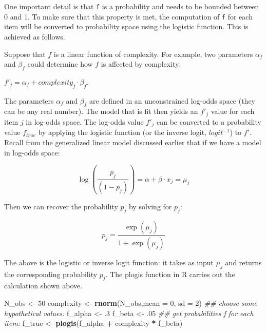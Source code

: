 \documentclass[12pt,]{krantz}
\newenvironment{Shaded}{\begin{snugshade}}{\end{snugshade}}
\newcommand{\CommentTok}[1]{\textcolor[rgb]{0.56,0.35,0.01}{\textit{#1}}}
\newcommand{\DataTypeTok}[1]{\textcolor[rgb]{0.13,0.29,0.53}{#1}}
\newcommand{\DecValTok}[1]{\textcolor[rgb]{0.00,0.00,0.81}{#1}}
\newcommand{\FloatTok}[1]{\textcolor[rgb]{0.00,0.00,0.81}{#1}}
\newcommand{\KeywordTok}[1]{\textcolor[rgb]{0.13,0.29,0.53}{\textbf{#1}}}
\newcommand{\NormalTok}[1]{#1}
\newcommand{\OperatorTok}[1]{\textcolor[rgb]{0.81,0.36,0.00}{\textbf{#1}}}
\newcommand{\StringTok}[1]{\textcolor[rgb]{0.31,0.60,0.02}{#1}}
\theoremstyle{definition}
\theoremstyle{definition}
\theoremstyle{definition}
\theoremstyle{remark}
\begin{document}
One important detail is that \texttt{f} is a probability and needs to be bounded between 0 and 1. To make sure that this property is met, the computation of \texttt{f} for each item will be converted to probability space using the logistic function. This is achieved as follows.

Suppose that \(f\) is a linear function of complexity. For example, two parameters \(\alpha_f\) and \(\beta_f\) could determine how \(f\) is affected by complexity:

\(f'_j=\alpha_f + complexity_j\cdot \beta_f\).

The parameters \(\alpha_f\) and \(\beta_f\) are defined in an unconstrained log-odds space (they can be any real number). The model that is fit then yields an \(f'_j\) value for each item \(j\) in log-odds space. The log-odds value \(f'_j\) can be converted to a probability value \(f_{true}\) by applying the logistic function (or the inverse logit, \(logit^{-1}\)) to \(f'\). Recall from the generalized linear model discussed earlier that if we have a model in log-odds space:

\begin{equation}
\log \left(\frac{p_j}{(1-p_j)}\right) = \alpha + \beta\cdot x_j = \mu_j
\end{equation}

Then we can recover the probability \(p_j\) by solving for \(p_j\):

\begin{equation}
p_j = \frac{\exp(\mu_j)}{1+\exp(\mu_j)}
\end{equation}

The above is the logistic or inverse logit function: it takes as input \(\mu_j\) and returns the corresponding probability \(p_j\). The plogis function in R carries out the calculation shown above.

\begin{Shaded}
\begin{Highlighting}[]
\NormalTok{N_obs <-}\StringTok{ }\DecValTok{50}
\NormalTok{complexity <-}\StringTok{ }\KeywordTok{rnorm}\NormalTok{(N_obs,}\DataTypeTok{mean =} \DecValTok{0}\NormalTok{, }\DataTypeTok{sd =} \DecValTok{2}\NormalTok{)}
\CommentTok{## choose some hypothetical values:}
\NormalTok{f_alpha <-}\StringTok{ }\FloatTok{.3}
\NormalTok{f_beta <-}\StringTok{ }\FloatTok{.05}
\CommentTok{## get probabilities f for each item:}
\NormalTok{f_true <-}\StringTok{ }\KeywordTok{plogis}\NormalTok{(f_alpha }\OperatorTok{+}\StringTok{ }\NormalTok{complexity }\OperatorTok{*}\StringTok{ }\NormalTok{f_beta)}
\end{Highlighting}
\end{Shaded}
\end{document}
